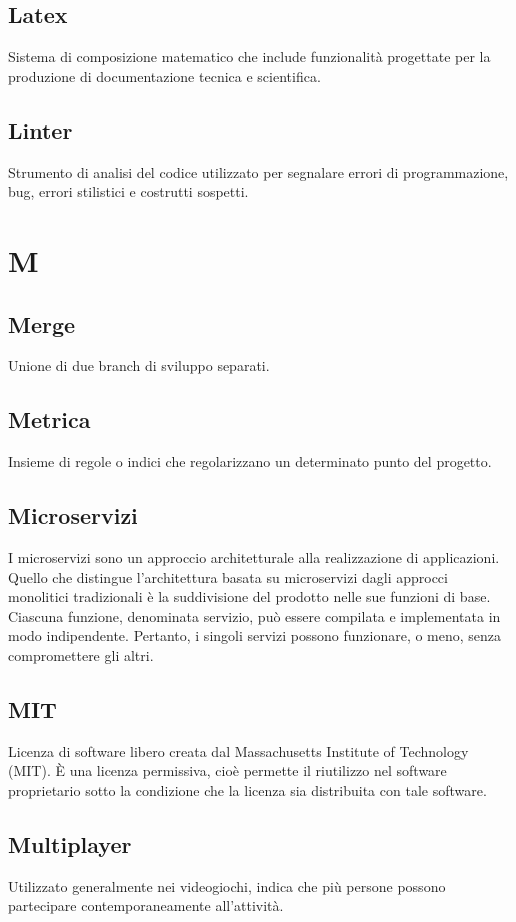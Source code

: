 \subsection*{Latex}
Sistema di composizione matematico che include funzionalità progettate per la produzione di documentazione tecnica e scientifica.

\subsection*{Linter}
Strumento di analisi del codice utilizzato per segnalare errori di programmazione, bug, errori stilistici e costrutti sospetti.

\newpage
\section{M}
\subsection*{Merge}
Unione di due branch di sviluppo separati.

\subsection*{Metrica}
Insieme di regole o indici che regolarizzano un determinato punto del progetto.

\subsection*{Microservizi}
I microservizi sono un approccio architetturale alla realizzazione di applicazioni. 
Quello che distingue l'architettura basata su microservizi dagli approcci monolitici tradizionali è la suddivisione del prodotto nelle sue funzioni di base. Ciascuna funzione, denominata servizio, può essere compilata e implementata in modo indipendente. Pertanto, i singoli servizi possono funzionare, o meno, senza compromettere gli altri.

\subsection*{MIT}
Licenza di software libero creata dal Massachusetts Institute of Technology (MIT). È una licenza permissiva, cioè permette il riutilizzo nel software proprietario sotto la condizione che la licenza sia distribuita con tale software.

\subsection*{Multiplayer}
Utilizzato generalmente nei videogiochi, indica che più persone possono partecipare contemporaneamente all'attività.

